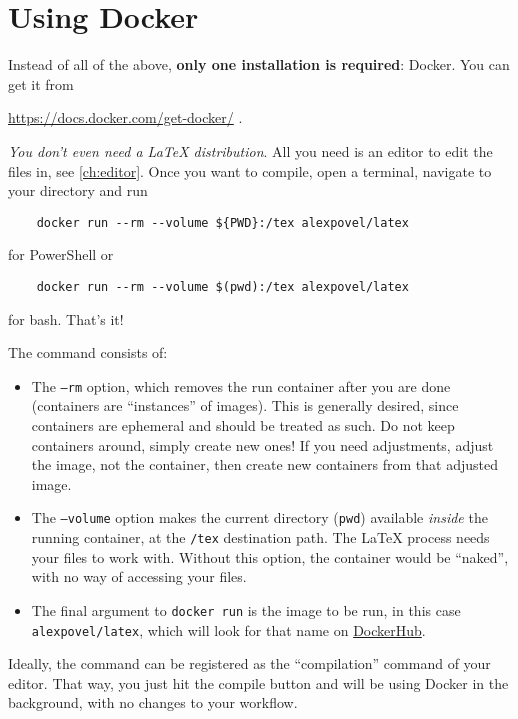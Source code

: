 \section{Using Docker}
\label{ch:using-docker}

Instead of all of the above, \textbf{only one installation is required}: Docker.
You can get it from
\begin{center}
    \url{https://docs.docker.com/get-docker/} .
\end{center}
\emph{You don't even need a \LaTeX{} distribution}.
All you need is an editor to edit the files in, see \cref{ch:editor}.
Once you want to compile, open a terminal, navigate to your directory and run
\begin{verbatim}
    docker run --rm --volume ${PWD}:/tex alexpovel/latex
\end{verbatim}
for PowerShell or
\begin{verbatim}
    docker run --rm --volume $(pwd):/tex alexpovel/latex
\end{verbatim}
for bash.
That's it!

The command consists of:
\begin{itemize}
    \item The \texttt{--rm} option, which removes the run container after you are done
        (containers are \enquote{instances} of images).
        This is generally desired, since containers are ephemeral and should be treated as such.
        Do not keep containers around, simply create new ones!
        If you need adjustments, adjust the image, not the container, then create new containers
        from that adjusted image.
    \item The \texttt{--volume} option makes the current directory (\texttt{pwd})
        available \emph{inside} the running container, at the \texttt{/tex} destination path.
        The \LaTeX{} process needs your files to work with.
        Without this option, the container would be \enquote{naked}, with no way of
        accessing your files.
    \item The final argument to \texttt{docker run} is the image to be run, in this case
        \texttt{alexpovel/latex}, which will look for that name on
        \href{https://hub.docker.com/}{DockerHub}.
\end{itemize}

Ideally, the command can be registered as the \enquote{compilation} command of your
editor.
That way, you just hit the compile button and will be using Docker in the background,
with no changes to your workflow.

